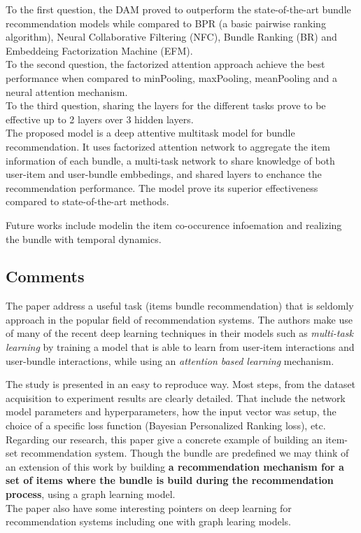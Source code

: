 \documentclass{article}
\begin{document}
To the first question, the DAM proved to outperform the state-of-the-art 
bundle recommendation models while compared to BPR (a basic pairwise ranking
algorithm), Neural Collaborative Filtering (NFC), Bundle Ranking (BR) and 
Embeddeing Factorization Machine (EFM).\\
To the second question, the factorized attention approach achieve the best performance  when compared to minPooling, maxPooling, meanPooling and a neural 
attention mechanism.\\
To the third question, sharing the layers for the different tasks prove to be 
effective up to 2 layers over 3 hidden layers.\\

The proposed model is a deep attentive multitask model for bundle 
recommendation. It uses factorized attention network to aggregate the item 
information of each bundle, a multi-task network to share knowledge of 
both user-item and user-bundle embbedings, and shared layers to enchance 
the recommendation performance. The model prove its superior effectiveness 
compared to state-of-the-art methods.

Future works include modelin the item co-occurence infoemation and realizing 
the bundle with temporal dynamics.

\subsection*{Comments}
The paper address a useful task (items bundle recommendation) that is 
seldomly approach in the popular field of recommendation systems. 
The authors make use of many of the recent deep learning  techniques in their 
models such as  \textit{multi-task learning} by training a 
model that is able to learn from user-item interactions and user-bundle 
interactions, while using an \textit{attention based learning} mechanism. 

The study is presented in an easy to reproduce way. Most steps, from the 
dataset acquisition to experiment results are clearly detailed. That include 
the network model parameters and hyperparameters, how the input vector 
was setup, the choice of a specific loss function (Bayesian Personalized 
Ranking loss), etc.\\

Regarding our research, this paper give a concrete example of building an 
item-set recommendation system. Though the bundle are predefined we may 
think of an extension of this work by building \textbf{a recommendation 
mechanism for a set of items where the bundle is build during the 
recommendation process}, using a graph learning model.\\
The paper also have some interesting pointers on deep learning for 
recommendation systems including one with graph learing models.
\end{document}
